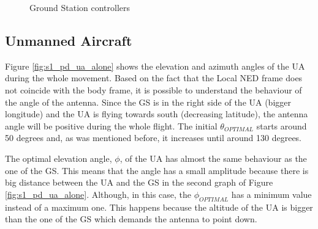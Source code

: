 \begin{figure}[H]
	\hfill
	\hfill
	\caption{Ground Station controllers}
	\label{fig:s1_gs}
\end{figure}

\subsection{Unmanned Aircraft}
Figure \ref{fig:s1_pd_ua_alone} shows the elevation and azimuth angles of the UA during the whole movement. Based on the fact that the Local NED frame does not coincide with the body frame, it is possible to understand the behaviour of the angle of the antenna. Since the GS is in the right side of the UA (bigger longitude) and the UA is flying towards south (decreasing latitude), the antenna angle will be positive during the whole flight.
The initial $\theta_{OPTIMAL}$ starts around 50 degrees and, as was mentioned before, it increases until around 130 degrees.

The optimal elevation angle, $\phi$, of the UA has almost the same behaviour as the one of the GS. This means that the angle has a small amplitude because there is big distance between the UA and the GS in the second graph of Figure \ref{fig:s1_pd_ua_alone}. Although, in this case, the $\phi_{OPTIMAL}$ has a minimum value instead of a maximum one. This happens because the altitude of the UA is bigger than the one of the GS which demands the antenna to point down.


